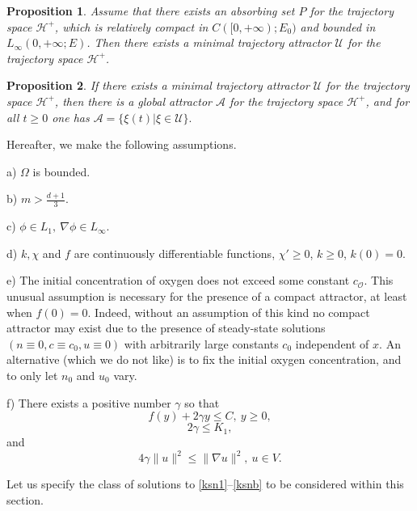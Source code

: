 \documentclass[10pt]{amsart}
\newtheorem {prop} {Proposition} [section]
\begin{document}
\begin{prop} \label{415} Assume that there exists an absorbing set $P $ for
the trajectory space $ \mathcal {H} ^ + $, which is relatively compact in $C ([0, + \infty); E_0) $
and bounded in $L_\infty (0, + \infty; E) $. Then there exists a
minimal trajectory attractor $ \mathcal {U} $ for the trajectory
space $ \mathcal {H} ^ + $. \end{prop}

\begin {prop} \label{416} If there exists a minimal
trajectory attractor $ \mathcal {U} $ for the trajectory space $
\mathcal {H} ^ + $, then there is a global attractor $ \mathcal
{A} $ for the trajectory space $ \mathcal {H} ^ + $, and for all $t\geq 0 $ one has $ \mathcal {A} =\{\xi (t) |\xi\in\mathcal {U} \}. $
\end {prop}

Hereafter, we make the following assumptions. 

a) $\Omega$ is bounded.

b) $m>\frac {d+1} 3$. 

c) $\phi\in L_1,\ \nabla \phi\in L_\infty$.

d) $k,\chi$ and $f$ are continuously differentiable functions, $\chi'\geq 0$, $k\geq 0$, $k(0)= 0$.

e) The initial concentration of oxygen does not exceed some constant $c_\mathcal{O}$. This unusual assumption is necessary for the presence of a compact attractor, at least when $f(0)=0$. Indeed, without an assumption of this kind no compact attractor may exist due to the presence of steady-state solutions $(n\equiv 0, c\equiv c_0, u\equiv 0)$ with arbitrarily large constants $c_0$ independent of $x$.  An alternative (which we do not like) is to fix the initial oxygen concentration, and to only let $n_0$ and $u_0$ vary. 

f) There exists a positive number $\gamma$ so that
\begin{equation}\label{asfs}f(y)+2\gamma y \leq C,\ y\geq 0,\end{equation} 
\begin{equation}\label{lam1} 2 \gamma\leq K_1,\end{equation}
and 
\begin{equation}\label{lam}4 \gamma\|u\|^2\leq \|\nabla u\|^2,\ u\in V.\end{equation}

Let us specify the class of solutions to \eqref{ksn1}--\eqref{ksnb} to be considered within this section. 
\end{document}
